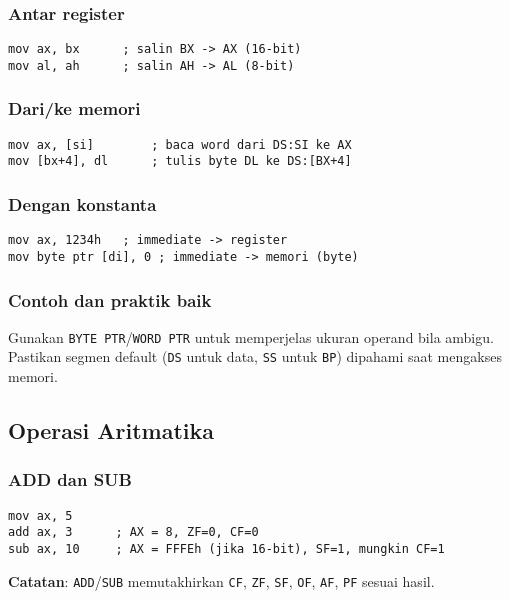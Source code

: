 \subsubsection{Antar register}
\begin{verbatim}
mov ax, bx      ; salin BX -> AX (16-bit)
mov al, ah      ; salin AH -> AL (8-bit)
\end{verbatim}

\subsubsection{Dari/ke memori}
\begin{verbatim}
mov ax, [si]        ; baca word dari DS:SI ke AX
mov [bx+4], dl      ; tulis byte DL ke DS:[BX+4]
\end{verbatim}

\subsubsection{Dengan konstanta}
\begin{verbatim}
mov ax, 1234h   ; immediate -> register
mov byte ptr [di], 0 ; immediate -> memori (byte)
\end{verbatim}

\subsubsection{Contoh dan praktik baik}
Gunakan \texttt{BYTE PTR}/\texttt{WORD PTR} untuk memperjelas ukuran operand bila ambigu. Pastikan segmen default (\texttt{DS} untuk data, \texttt{SS} untuk \texttt{BP}) dipahami saat mengakses memori.

\subsection{Operasi Aritmatika}
\subsubsection{ADD dan SUB}
\begin{verbatim}
mov ax, 5
add ax, 3      ; AX = 8, ZF=0, CF=0
sub ax, 10     ; AX = FFFEh (jika 16-bit), SF=1, mungkin CF=1
\end{verbatim}
\textbf{Catatan}: \texttt{ADD}/\texttt{SUB} memutakhirkan \texttt{CF}, \texttt{ZF}, \texttt{SF}, \texttt{OF}, \texttt{AF}, \texttt{PF} sesuai hasil.

